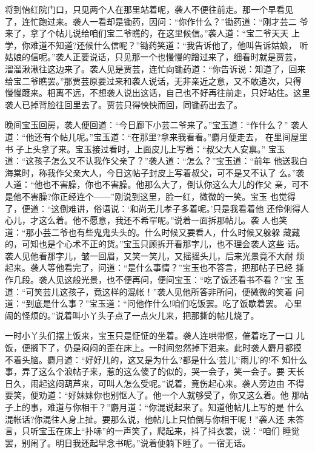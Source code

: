 将到怡红院门口，只见两个人在那里站着呢，袭人不便往前走。那一个早看见
了，连忙跑过来。袭人一看却是锄药，因问：“你作什么？”锄药道：“刚才芸二
爷来了，拿了个帖儿说给咱们宝二爷瞧的，在这里候信。”袭人道：“宝二爷天天
上学，你难道不知道?还候什么信呢？”锄药笑道：“我告诉他了，他叫告诉姑娘，
听姑娘的信呢。”袭人正要说话，只见那一个也慢慢的蹭过来了，细看时就是贾芸，
溜溜湫湫往这边来了。袭人见是贾芸，连忙向锄药道：“你告诉说：知道了，回来
给宝二爷瞧罢。”那贾芸原要过来和袭人说话，无非亲近之意，又不敢造次，只得
慢慢踱来。相离不远，不想袭人说出这话，自己也不好再往前走，只好站住。这里
袭人已掉背脸往回里去了。贾芸只得怏怏而回，同锄药出去了。

晚间宝玉回房，袭人便回道：“今日廊下小芸二爷来了。”宝玉道：“作什么？”
袭人道：“他还有个帖儿呢。”宝玉道：“在那里?拿来我看看。”麝月便走去，
在里间屋里书子上头拿了来。宝玉接过看时，上面皮儿上写着：“叔父大人安禀。”
宝玉道：“这孩子怎么又不认我作父亲了？”袭人道：“怎么？”宝玉道：“前年
他送我白海棠时，称我作父亲大人，今日这帖子封皮上写着叔父，可不是又不认了
么。”袭人道：“他也不害臊，你也不害臊。他那么大了，倒认你这么大儿的作父
亲，可不是他不害臊?你正经连个——”刚说到这里，脸一红，微微的一笑。宝玉
也觉得了，便道：“这倒难讲，俗语说：‘和尚无儿孝子多着呢。’只是我看着他
还伶俐得人心儿，才这么着。他不愿意，我还不希罕呢。”说着一面拆那帖儿。袭
人也笑道：“那小芸二爷也有些鬼鬼头头的。什么时候又要看人，什么时候又躲躲
藏藏的，可知也是个心术不正的货。”宝玉只顾拆开看那字儿，也不理会袭人这些
话。袭人见他看那字儿，皱一回眉，又笑一笑儿，又摇摇头儿，后来光景竟不大耐
烦起来。袭人等他看完了，问道：“是什么事情？”宝玉也不答言，把那帖子已经
撕作几段。袭人见这般光景，也不便再问，便问宝玉：“吃了饭还看书不看？”宝
玉道：“可笑芸儿这孩子，竟这样的混帐！”袭人见他所答非所问，便微微的笑着
问道：“到底是什么事？”宝玉道：“问他作什么!咱们吃饭罢。吃了饭歇着罢。
心里闹的怪烦的。”说着叫小丫头子点了一点火儿来，把那撕的帖儿烧了。

一时小丫头们摆上饭来，宝玉只是怔怔的坐着。袭人连哄带怄，催着吃了一口
儿饭，便搁下了，仍是闷闷的歪在床上。一时间忽然掉下泪来。此时袭人麝月都摸
不着头脑。麝月道：“好好儿的，这又是为什么?都是什么‘芸儿’‘雨儿’的!不
知什么事，弄了这么个浪帖子来，惹的这么傻了的似的，哭一会子，笑一会子。要
天长日久，闹起这闷葫芦来，可叫人怎么受呢。”说着，竟伤起心来。袭人旁边由
不得要笑，便劝道：“好妹妹你也别怄人了。他一个人就够受了，你又这么着。他
那帖子上的事，难道与你相干？”麝月道：“你混说起来了。知道他帖儿上写的是
什么混帐话?你混往人身上扯。要那么说，他帖儿上只怕倒与你相干呢！”袭人还
未答言，只听宝玉在床上“扑哧”的一声笑了，爬起来，抖了抖衣裳，说：“咱们
睡觉罢，别闹了。明日我还起早念书呢。”说着便躺下睡了。一宿无话。

